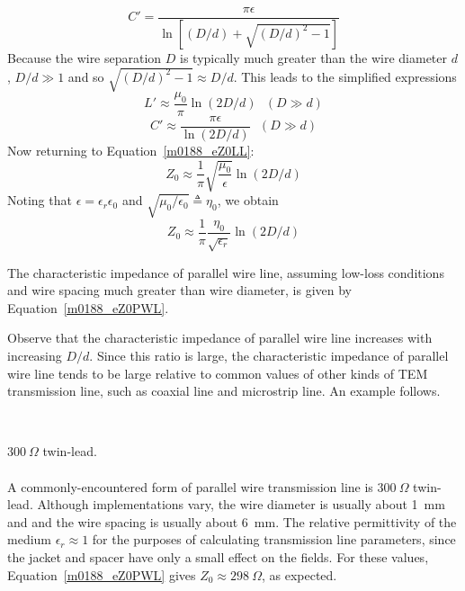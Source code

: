 %
\begin{equation}
C' = \frac{\pi\epsilon}{\ln\left[ \left(D/d\right) +\sqrt{\left(D/d\right)^2-1 } \right]}
\end{equation}
%
Because the wire separation $D$ is typically much greater than the wire diameter $d$, $D/d\gg 1$ and so 
$\sqrt{\left(D/d\right)^2-1} \approx D/d$.  This leads to the simplified expressions
%
\begin{equation}
L' \approx \frac{\mu_0}{\pi}\ln\left( 2D/d \right) ~~~ (D \gg d)
\end{equation}
%
\begin{equation}
C' \approx \frac{\pi\epsilon}{\ln\left( 2D/d \right)} ~~~ (D \gg d)
\end{equation}
%
Now returning to Equation~\ref{m0188_eZ0LL}:
%
\begin{equation}
Z_0 \approx \frac{1}{\pi}\sqrt{\frac{\mu_0}{\epsilon}}\ln\left( 2D/d \right)
\end{equation}
%
Noting that $\epsilon=\epsilon_r\epsilon_0$ and $\sqrt{\mu_0/\epsilon_0}\triangleq\eta_0$, we obtain
%
\begin{equation}
\boxed{
Z_0 \approx \frac{1}{\pi}\frac{\eta_0}{\sqrt{\epsilon_r}}\ln\left( 2D/d \right)
}
\label{m0188_eZ0PWL}
\end{equation}
%
\begin{mdframed}[backgroundcolor=yellow!20,nobreak=true] 
The characteristic impedance of parallel wire line, assuming low-loss conditions and wire spacing much greater than wire diameter, is given by Equation~\ref {m0188_eZ0PWL}.
\end{mdframed}
%
Observe that the characteristic impedance of parallel wire line increases with increasing $D/d$.  Since this ratio is large, the characteristic impedance of parallel wire line tends to be large relative to common values of other kinds of TEM transmission line, such as coaxial line and microstrip line.  An example follows.

~\\ \begin{example} 
\begin{mdframed}[backgroundcolor=brown!20,linecolor=brown!20]\raggedright
$300~\Omega$ twin-lead.
\\~\\
A commonly-encountered form of parallel wire transmission line is $300~\Omega$ twin-lead.
Although implementations vary, the wire diameter is usually about 1~mm and and the wire spacing is usually about 6~mm.
The relative permittivity of the medium $\epsilon_r\approx 1$ for the purposes of calculating transmission line parameters, since the jacket and spacer have only a small effect on the fields.
 For these values, Equation~\ref{m0188_eZ0PWL} gives $Z_0\approx 298~\Omega$, as expected.
\end{mdframed}
\end{example}

